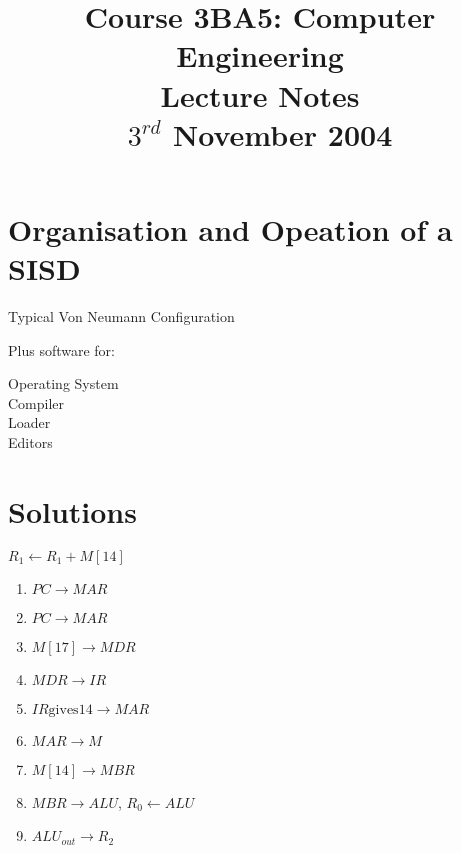 \documentclass[a4paper,12pt]{article}
\begin{document}
\title{Course 3BA5: Computer Engineering \\ Lecture Notes \\ $3^{rd}$ November 2004}

\maketitle

\section*{Organisation and Opeation of a SISD}

\begin{table}[hbtp]


\caption{Typical Von Neumann Configuration}

\end{table}

Plus software for:

Operating System \\
Compiler \\
Loader \\
Editors

\section*{Solutions}

$R_{1} \leftarrow R_{1} + M[14]$

\begin{enumerate}

\item $PC \rightarrow MAR$

\item $PC \rightarrow MAR$

\item $M[17] \rightarrow MDR$

\item $MDR \rightarrow IR$

\item $IR \mbox{gives} 14 \rightarrow MAR$

\item $MAR \rightarrow M$

\item $M[14] \rightarrow MBR$

\item $MBR \rightarrow ALU$, $R_{0} \leftarrow ALU$

\item $ALU_{out} \rightarrow R_{2}$

\end{enumerate}
\end{document}

